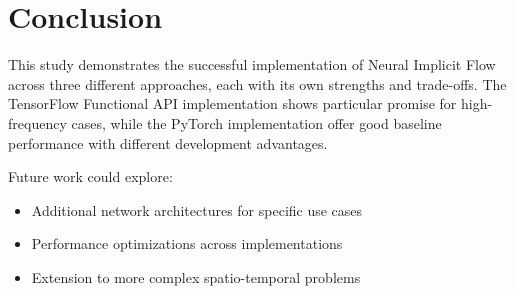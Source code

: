 \documentclass[10pt,journal,compsoc,onecolumn]{IEEEtran}
\begin{document}
\section{Conclusion}\label{sec:conclusion}
This study demonstrates the successful implementation of Neural Implicit Flow across three different approaches, each with its own strengths and trade-offs. The TensorFlow Functional API implementation shows particular promise for high-frequency cases, while the PyTorch implementation offer good baseline performance with different development advantages.

Future work could explore:
\begin{itemize}
    \item Additional network architectures for specific use cases
    \item Performance optimizations across implementations
    \item Extension to more complex spatio-temporal problems
\end{itemize}



\end{document}
